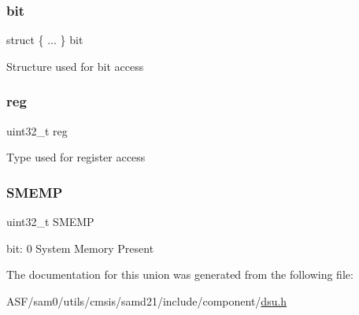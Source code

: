\subsubsection{\texorpdfstring{bit}{bit}}
{\footnotesize\ttfamily struct \{ ... \}   bit}

Structure used for bit access \mbox{\label{union_d_s_u___m_e_m_t_y_p_e___type_a6b91636401516a477989a336376d7b40}} 
\subsubsection{\texorpdfstring{reg}{reg}}
{\footnotesize\ttfamily uint32\+\_\+t reg}

Type used for register access \mbox{\label{union_d_s_u___m_e_m_t_y_p_e___type_a2b3f5c16e144ac7f8a0f7448a27e8eed}} 
\subsubsection{\texorpdfstring{SMEMP}{SMEMP}}
{\footnotesize\ttfamily uint32\+\_\+t S\+M\+E\+MP}

bit\+: 0 System Memory Present 

The documentation for this union was generated from the following file\+:\begin{DoxyCompactItemize}
\item 
A\+S\+F/sam0/utils/cmsis/samd21/include/component/\mbox{\hyperlink{component_2dsu_8h}{dsu.\+h}}\end{DoxyCompactItemize}
